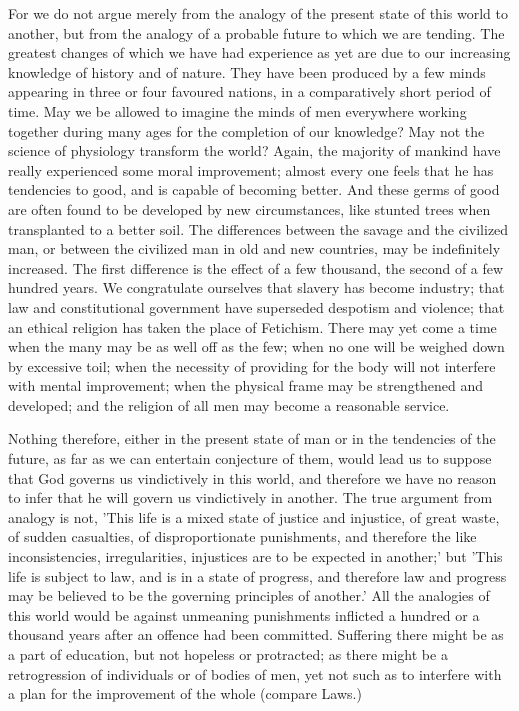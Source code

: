 \documentclass[11pt,letter]{article}
\begin{document}
\par  For we do not argue merely from the analogy of the present state of this world to another, but from the analogy of a probable future to which we are tending. The greatest changes of which we have had experience as yet are due to our increasing knowledge of history and of nature. They have been produced by a few minds appearing in three or four favoured nations, in a comparatively short period of time. May we be allowed to imagine the minds of men everywhere working together during many ages for the completion of our knowledge? May not the science of physiology transform the world? Again, the majority of mankind have really experienced some moral improvement; almost every one feels that he has tendencies to good, and is capable of becoming better. And these germs of good are often found to be developed by new circumstances, like stunted trees when transplanted to a better soil. The differences between the savage and the civilized man, or between the civilized man in old and new countries, may be indefinitely increased. The first difference is the effect of a few thousand, the second of a few hundred years. We congratulate ourselves that slavery has become industry; that law and constitutional government have superseded despotism and violence; that an ethical religion has taken the place of Fetichism. There may yet come a time when the many may be as well off as the few; when no one will be weighed down by excessive toil; when the necessity of providing for the body will not interfere with mental improvement; when the physical frame may be strengthened and developed; and the religion of all men may become a reasonable service.

\par  Nothing therefore, either in the present state of man or in the tendencies of the future, as far as we can entertain conjecture of them, would lead us to suppose that God governs us vindictively in this world, and therefore we have no reason to infer that he will govern us vindictively in another. The true argument from analogy is not, 'This life is a mixed state of justice and injustice, of great waste, of sudden casualties, of disproportionate punishments, and therefore the like inconsistencies, irregularities, injustices are to be expected in another;' but 'This life is subject to law, and is in a state of progress, and therefore law and progress may be believed to be the governing principles of another.' All the analogies of this world would be against unmeaning punishments inflicted a hundred or a thousand years after an offence had been committed. Suffering there might be as a part of education, but not hopeless or protracted; as there might be a retrogression of individuals or of bodies of men, yet not such as to interfere with a plan for the improvement of the whole (compare Laws.)
\end{document}

